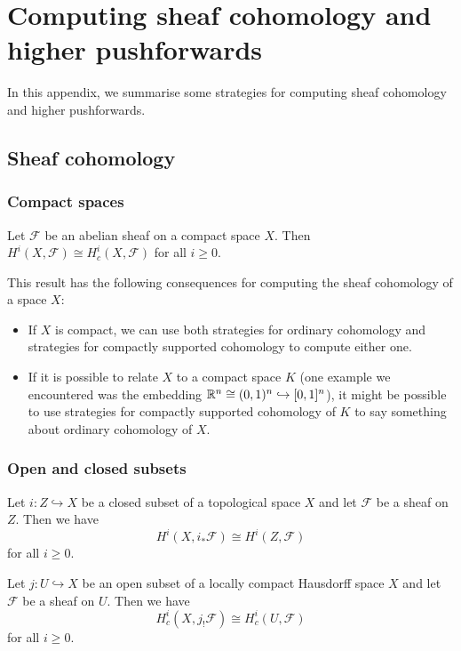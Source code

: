 \chapter{Computing sheaf cohomology and higher pushforwards}

In this appendix, we summarise some strategies for computing sheaf cohomology and higher pushforwards.

\section{Sheaf cohomology}

\subsection{Compact spaces}
\begin{lem}[name={\cref{lem:compactly-supported-cohomology-is-ordinary-cohomology-on-compact-space}}]
Let \(\mathcal F\) be an abelian sheaf on a compact space \(X\).
Then \(H^i(X,\mathcal F)\cong H^i_c(X,\mathcal F)\) for all \(i\geq 0\).
\end{lem}

This result has the following consequences for computing the sheaf cohomology of a space \(X\):
\begin{itemize}
\item If \(X\) is compact, we can use both strategies for ordinary cohomology and strategies for compactly supported cohomology to compute either one.
\item If it is possible to relate \(X\) to a compact space \(K\) (one example we encountered was the embedding \(\mathbb{R}^n\cong(0,1)^n\hookrightarrow [0,1]^n\)), it might be possible to use strategies for compactly supported cohomology of \(K\) to say something about ordinary cohomology of \(X\).
\end{itemize}

\subsection{Open and closed subsets}
\begin{lem}
Let \(i\colon Z\hookrightarrow X\) be a closed subset of a topological space \(X\) and let \(\mathcal F\) be a sheaf on \(Z\).
Then we have
\[ H^i(X,i_*\mathcal F) \cong H^i(Z,\mathcal F) \]
for all \(i\geq 0\).
\end{lem}

\begin{lem}[name={Additional exercise~13.1(d)}]
Let \(j\colon U\hookrightarrow X\) be an open subset of a locally compact Hausdorff space \(X\) and let \(\mathcal F\) be a sheaf on \(U\).
Then we have
\[ H^i_c(X,j_!\mathcal F) \cong H^i_c(U,\mathcal F) \]
for all \(i\geq 0\).
\end{lem}

